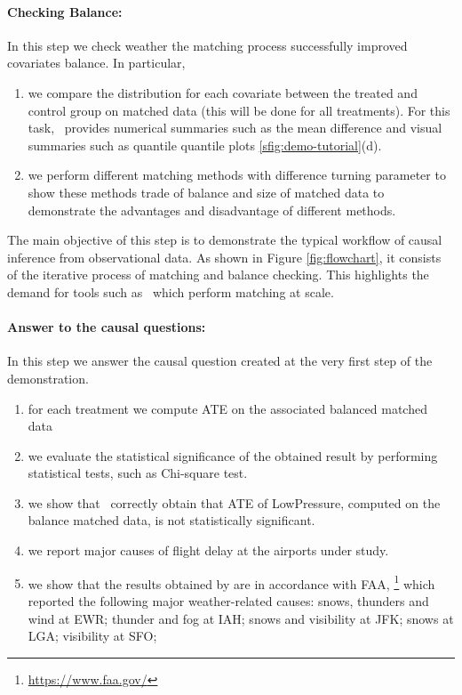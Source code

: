 \paragraph{\bf Checking Balance:}  In this step we check weather the matching process  successfully improved covariates balance. In particular,
    \begin{enumerate}
      \item  we compare the distribution for each covariate between the treated and control group on matched data (this will be done for all treatments). For this task, \GSQL\  provides numerical summaries such as the mean difference and visual summaries such as quantile quantile plots \ref{sfig:demo-tutorial}(d).

      \item  we perform different matching methods with difference turning parameter to show these methods trade of balance and size of matched data to demonstrate the advantages and disadvantage of different methods.
       \end{enumerate}
      The main objective of this step is to demonstrate the typical workflow of causal inference from observational data. As shown in Figure \ref{fig:flowchart}, it consists of the iterative process of matching and balance checking. This highlights the demand for tools such as \GSQL\, which perform matching at scale.

     \paragraph{\bf Answer to the causal questions:}  In this step  we answer the causal question created at the very first step of the demonstration.
       \begin{enumerate}
       \item for each treatment we compute ATE on the associated balanced matched data
      \item we evaluate the statistical significance of the obtained result by performing statistical tests, such as Chi-square test.
    \item we show that \GSQL\ correctly obtain that ATE of LowPressure, computed on the balance matched data, is not statistically significant.
        \item we report major causes of flight delay at the airports under study.
    \item   we show that the results obtained by \GSQL are in accordance with
FAA, \footnote{\url{https://www.faa.gov/}} which reported the following major weather-related
causes:
snows, thunders and wind at EWR; thunder and fog at IAH;
snows and visibility at JFK; snows at LGA; visibility at SFO;

        \end{enumerate}



